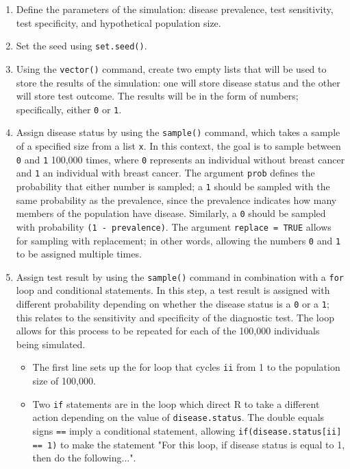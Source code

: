 \documentclass{report}\usepackage[]{graphicx}\usepackage[]{color}
\begin{document}
\begin{enumerate}
  \item Define the parameters of the simulation: disease prevalence, test sensitivity, test specificity, and hypothetical population size.
  
  \item Set the seed using \texttt{set.seed()}. 
  
  \item Using the \texttt{vector()} command, create two empty lists that will be used to store the results of the simulation: one will store disease status and the other will store test outcome. The results will be in the form of numbers; specifically, either \texttt{0} or \texttt{1}. 
  
  \item Assign disease status by using the \texttt{sample()} command, which takes a sample of a specified size from a list \texttt{x}. In this context, the goal is to sample between \texttt{0} and \texttt{1} 100,000 times, where \texttt{0} represents an individual without breast cancer and \texttt{1} an individual with breast cancer. The argument \texttt{prob} defines the probability that either number is sampled; a \texttt{1} should be sampled with the same probability as the prevalence, since the prevalence indicates how many members of the population have disease. Similarly, a \texttt{0} should be sampled with probability \texttt{(1 - prevalence)}. The argument \texttt{replace = TRUE} allows for sampling with replacement; in other words, allowing the numbers \texttt{0} and \texttt{1} to be assigned multiple times. 
  
  \item Assign test result by using the \texttt{sample()} command in combination with a \texttt{for} loop and conditional statements. In this step, a test result is assigned with different probability depending on whether the disease status is a \texttt{0} or a \texttt{1}; this relates to the sensitivity and specificity of the diagnostic test. The loop allows for this process to be repeated for each of the 100,000 individuals being simulated.
  
  \begin{itemize}
    \item The first line sets up the for loop that cycles \texttt{ii} from 1 to the population size of 100,000.
    
    \item Two \texttt{if} statements are in the loop which direct \textsf{R} to take a different action depending on the value of \texttt{disease.status}. The double equals signs \texttt{==} imply a conditional statement, allowing \texttt{if(disease.status[ii] == 1)} to make the statement "For this loop, if disease status is equal to 1, then do the following...".
    

\end{itemize}
\end{enumerate}
\end{document}
